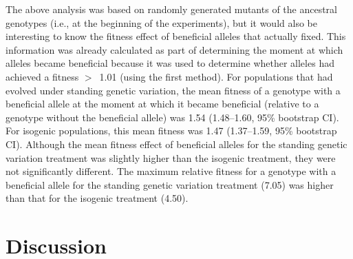 \begin{doublespace}
The above analysis was based on randomly generated mutants
of the ancestral genotypes (i.e., at the beginning of the experiments),
but it would also be interesting to know
the fitness effect of beneficial alleles that actually fixed.
%
This information was already calculated
as part of determining the moment at which alleles
became beneficial because it was used to determine
whether alleles had achieved a fitness $>$~1.01 (using the first method).
%
For populations that had evolved under standing genetic variation,
the mean fitness of a genotype with a beneficial allele
at the moment at which it became beneficial
(relative to a genotype without the beneficial allele)
was 1.54 (1.48--1.60, 95\% bootstrap CI).
%
For isogenic populations,
this mean fitness was 1.47 (1.37--1.59, 95\% bootstrap CI).
%
Although the mean fitness effect of beneficial alleles
for the standing genetic variation treatment
was slightly higher than the isogenic treatment,
they were not significantly different.
%
The maximum relative fitness for a genotype with a beneficial allele
for the standing genetic variation treatment (7.05)
was higher than that for the isogenic treatment (4.50).





\section{Discussion}






\end{doublespace}
